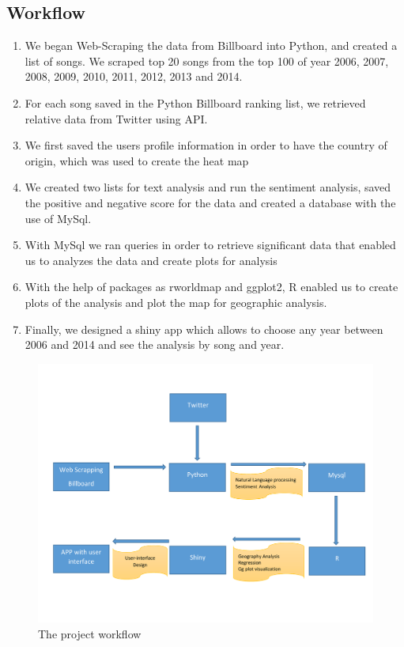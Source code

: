 \documentclass{article}
\begin{document}
\subsection{Workflow}
\begin{enumerate}
\item We began Web-Scraping the data from Billboard into Python, and created a list of songs. We scraped top 20 songs from the top 100 of year 2006, 2007, 2008, 2009, 2010, 2011, 2012, 2013 and 2014.
\item For each song saved in the Python Billboard ranking list, we retrieved relative data from Twitter using API. 
\item We first saved the users profile information in order to have the country of origin, which was used to create the heat map
\item We created two lists for text analysis and run the sentiment analysis, saved the positive and negative score for the data and created a database with the use of MySql. 
\item With MySql we ran queries in order to retrieve significant data that enabled us to analyzes the data and create plots for analysis
\item With the help of packages as rworldmap and ggplot2, R enabled us to create plots of the analysis and plot the map for geographic analysis. 
\item Finally, we designed a shiny app which allows to choose any year between 2006 and 2014  and see the analysis by song and year. 
\end{enumerate}
 \begin{figure}[H]
  \centering
  \includegraphics[scale=0.6]{WorkFlowGraph.pdf}
  \caption{The project workflow}
\end{figure}
\end{document}
